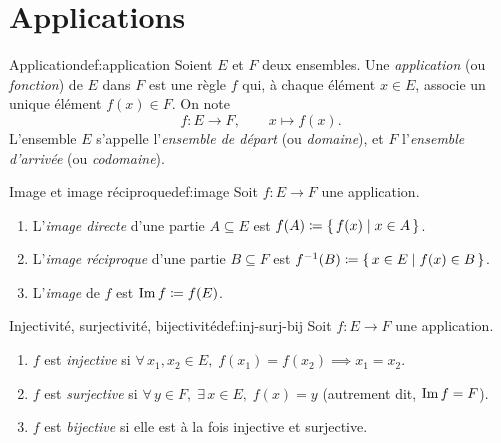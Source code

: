 \section{Applications}\label{sec:applications}

\begin{definition}{Application}{def:application}
  Soient $E$ et $F$ deux ensembles. Une \emph{application}
  (ou \emph{fonction}) de $E$ dans $F$ est une règle $f$ qui, à chaque
  élément $x\in E$, associe un unique élément $f(x)\in F$. On note
  \[
    f\colon E\to F,\qquad x\mapsto f(x).
  \]
  L'ensemble $E$ s'appelle l'\emph{ensemble de départ} (ou \emph{domaine}),
  et $F$ l'\emph{ensemble d'arrivée} (ou \emph{codomaine}).
\end{definition}

\begin{definition}{Image et image réciproque}{def:image}
  Soit $f\colon E\to F$ une application.
  \begin{enumerate}[label=(\roman*)]
    \item L'\emph{image directe} d'une partie $A\subseteq E$ est
      $f(A)\coloneqq\left\{\,f(x)\;\middle|\;x\in A\,\right\}$.
    \item L'\emph{image réciproque} d'une partie $B\subseteq F$ est
      $f^{-1}(B)\coloneqq\left\{\,x\in E\;\middle|\;f(x)\in B\,\right\}$.
    \item L'\emph{image} de $f$ est $\operatorname{Im} f\coloneqq f(E)$.
  \end{enumerate}
\end{definition}

\begin{definition}{Injectivité, surjectivité, bijectivité}{def:inj-surj-bij}
  Soit $f\colon E\to F$ une application.
  \begin{enumerate}[label=(\roman*)]
    \item $f$ est \emph{injective} si
      $\forall\, x_1,x_2\in E,\; f(x_1)=f(x_2)\implies x_1=x_2$.
    \item $f$ est \emph{surjective} si
      $\forall\, y\in F,\;\exists\, x\in E,\; f(x)=y$
      (autrement dit, $\operatorname{Im} f = F$).
    \item $f$ est \emph{bijective} si elle est à la fois
      injective et surjective.
  \end{enumerate}
\end{definition}

